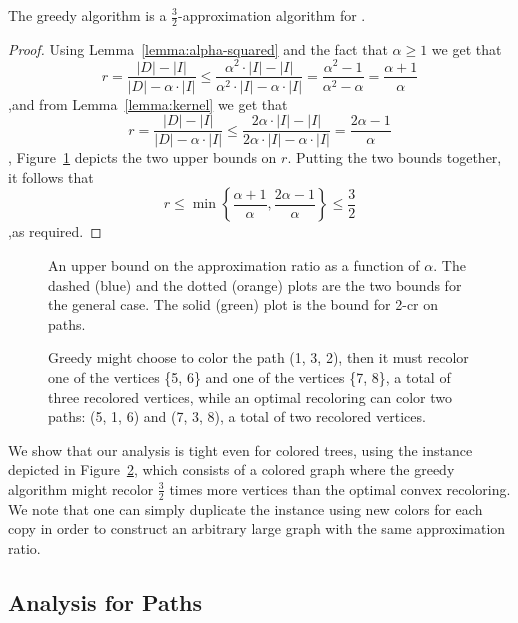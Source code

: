 \begin{theorem}
The greedy algorithm is a $\frac{3}{2}$-approximation algorithm for
\TWOCR{}.
\end{theorem}
\begin{proof}
Using Lemma~\ref{lemma:alpha-squared} and the fact that $\alpha \geq 1$ we get
that
$$
r
=    \frac{|D| - |I|}{|D| - \alpha \cdot |I|}
\leq \frac{\alpha ^ 2 \cdot |I| - |I|}{\alpha ^ 2 \cdot |I| - \alpha \cdot |I|}
=    \frac{\alpha ^ 2 - 1}{\alpha ^ 2 - \alpha}
=    \frac{\alpha+1}{\alpha}
$$
,and from Lemma~\ref{lemma:kernel} we get that
$$
r
=    \frac{|D| - |I|}{|D| - \alpha \cdot |I|}
\leq \frac{2 \alpha \cdot |I| - |I|}{2 \alpha \cdot |I| - \alpha \cdot |I|}
=    \frac{2 \alpha - 1}{\alpha}
$$,
Figure~\ref{fig:upper_bound} depicts the two upper bounds on $r$.
Putting the two bounds together, it follows that
\[
r
\leq \min \left\{\frac{\alpha+1}{\alpha} , \frac{2\alpha-1}{\alpha} \right\}
\leq    \frac{3}{2}
\]
,as required.
\end{proof}



\begin{figure}
\centering
{}
\caption{
\label{fig:upper_bound}
An upper bound on the approximation ratio as a function of $\alpha$.
The dashed (blue) and the dotted (orange) plots are the two bounds for the general case.
The solid (green) plot is the bound for 2-cr on paths.
}
\end{figure}

\begin{figure}
\centering
{}
\caption{
Greedy might choose to color the path (1, 3, 2), 
then it must recolor one of the vertices \{5, 6\} 
and one of the vertices \{7, 8\}, 
a total of three recolored vertices, 
while an optimal recoloring can color two paths: (5, 1, 6) and (7, 3, 8), 
a total of two recolored vertices.}
\label{fig:tight}
\end{figure}

We show that our analysis is tight even for colored trees, using the
instance depicted in Figure~\ref{fig:tight}, 
which consists of a colored graph where the greedy algorithm might recolor
$\frac{3}{2}$ times more vertices than the optimal convex recoloring.
%
We note that one can simply duplicate the instance using new colors for
each copy in order to construct an arbitrary large graph with the same
approximation ratio.


\subsection{Analysis for Paths}

